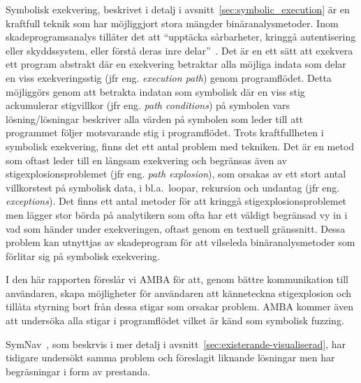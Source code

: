 Symbolisk exekvering, beskrivet i detalj i avsnitt~\ref{sec:symbolic_execution}
är en kraftfull teknik som har möjliggjort stora mängder
binäranalysmetoder\cite{survey_symb_exc, symnav}. Inom skadeprogramsanalys
tillåter det att ``upptäcka sårbarheter, kringgå autentisering eller
skyddssystem, eller förstå deras inre delar''~\cite{symnav}. Det är en ett sätt
att exekvera ett program abstrakt där en exekvering betraktar alla möjliga
indata som delar en viss exekveringsstig (jfr eng. \emph{execution path}) genom
programflödet. Detta möjliggörs genom att betrakta indatan som symbolisk där en
viss stig ackumulerar stigvillkor (jfr eng. \emph{path conditions}) på symbolen
vars lösning/lösningar beskriver alla värden på symbolen som leder till att
programmet följer motsvarande stig i programflödet. Trots kraftfullheten i
symbolisk exekvering, finns det ett antal problem med tekniken. Det är en metod
som oftast leder till en långsam exekvering och begränsas även av
stigexplosionsproblemet (jfr eng. \emph{path explosion}), som orsakas av ett
stort antal villkorstest på symbolisk data, i bl.a.\ loopar, rekursion och
undantag (jfr eng. \emph{exceptions}). Det finns ett antal metoder för att
kringgå stigexplosionsproblemet men lägger stor börda på analytikern som ofta
har ett väldigt begränsad vy in i vad som händer under exekveringen, oftast
genom en textuell gränssnitt. Dessa problem kan utnyttjas av skadeprogram för
att vilseleda binäranalysmetoder som förlitar sig på symbolisk exekvering.

I den här rapporten föreslår vi AMBA för att, genom bättre kommunikation till
användaren, skapa möjligheter för användaren att känneteckna stigexplosion och
tillåta styrning bort från dessa stigar som orsakar problem. AMBA kommer även
att undersöka alla stigar i programflödet vilket är känd som symbolisk fuzzing.

SymNav~\cite{symnav}, som beskrvis i mer detalj i
avsnitt~\ref{sec:existerande-visualiserad}, har tidigare undersökt samma problem och
föreslagit liknande lösningar men har begräsningar i form av prestanda.



%
